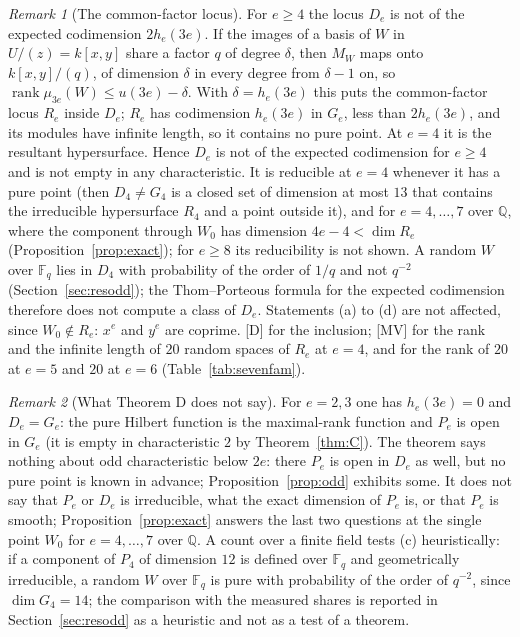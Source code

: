 \documentclass[11pt]{article}
\theoremstyle{definition}
\theoremstyle{remark}
\newtheorem{remark}{Remark}
\newcommand{\Q}{\mathbb{Q}}
\newcommand{\F}{\mathbb{F}}
\begin{document}
\begin{remark}[{The common-factor locus}]\label{rem:common}
For $e\ge4$ the locus $D_e$ is not of the expected codimension $2h_e(3e)$. If the images of a basis of $W$ in $U/(z)=k[x,y]$ share a factor $q$ of degree $\delta$, then $M_W$ maps onto $k[x,y]/(q)$, of dimension $\delta$ in every degree from $\delta-1$ on, so $\operatorname{rank}\mu_{3e}(W)\le u(3e)-\delta$. With $\delta=h_e(3e)$ this puts the common-factor locus $R_e$ inside $D_e$; $R_e$ has codimension $h_e(3e)$ in $G_e$, less than $2h_e(3e)$, and its modules have infinite length, so it contains no pure point. At $e=4$ it is the resultant hypersurface. Hence $D_e$ is not of the expected codimension for $e\ge4$ and is not empty in any characteristic. It is reducible at $e=4$ whenever it has a pure point (then $D_4\ne G_4$ is a closed set of dimension at most $13$ that contains the irreducible hypersurface $R_4$ and a point outside it), and for $e=4,\dots,7$ over $\Q$, where the component through $W_0$ has dimension $4e-4<\dim R_e$ (Proposition~\ref{prop:exact}); for $e\ge8$ its reducibility is not shown. A random $W$ over $\F_q$ lies in $D_4$ with probability of the order of $1/q$ and not $q^{-2}$ (Section~\ref{sec:resodd}); the Thom--Porteous formula for the expected codimension therefore does not compute a class of $D_e$. Statements (a) to (d) are not affected, since $W_0\notin R_e$: $x^e$ and $y^e$ are coprime. [D] for the inclusion; [MV] for the rank and the infinite length of $20$ random spaces of $R_e$ at $e=4$, and for the rank of $20$ at $e=5$ and $20$ at $e=6$ (Table~\ref{tab:sevenfam}).
\end{remark}

\begin{remark}[{What Theorem D does not say}]
For $e=2,3$ one has $h_e(3e)=0$ and $D_e=G_e$: the pure Hilbert function is the maximal-rank function and $P_e$ is open in $G_e$ (it is empty in characteristic $2$ by Theorem~\ref{thm:C}). The theorem says nothing about odd characteristic below $2e$: there $P_e$ is open in $D_e$ as well, but no pure point is known in advance; Proposition~\ref{prop:odd} exhibits some. It does not say that $P_e$ or $D_e$ is irreducible, what the exact dimension of $P_e$ is, or that $P_e$ is smooth; Proposition~\ref{prop:exact} answers the last two questions at the single point $W_0$ for $e=4,\dots,7$ over $\Q$. A count over a finite field tests (c) heuristically: if a component of $P_4$ of dimension $12$ is defined over $\F_q$ and geometrically irreducible, a random $W$ over $\F_q$ is pure with probability of the order of $q^{-2}$, since $\dim G_4=14$; the comparison with the measured shares is reported in Section~\ref{sec:resodd} as a heuristic and not as a test of a theorem.
\end{remark}
\end{document}
